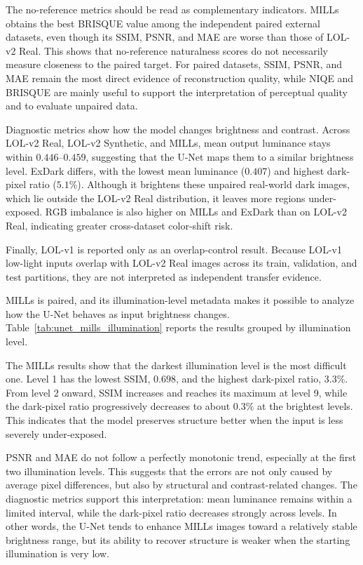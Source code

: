 The no-reference metrics should be read as complementary indicators. MILLs obtains the best BRISQUE value among the independent paired external datasets, even though its SSIM, PSNR, and MAE are worse than those of LOL-v2 Real. This shows that no-reference naturalness scores do not necessarily measure closeness to the paired target. For paired datasets, SSIM, PSNR, and MAE remain the most direct evidence of reconstruction quality, while NIQE and BRISQUE are mainly useful to support the interpretation of perceptual quality and to evaluate unpaired data.

Diagnostic metrics show how the model changes brightness and contrast. Across LOL-v2 Real, LOL-v2 Synthetic, and MILLs, mean output luminance stays within $0.446$--$0.459$, suggesting that the U-Net maps them to a similar brightness level. ExDark differs, with the lowest mean luminance ($0.407$) and highest dark-pixel ratio ($5.1\%$). Although it brightens these unpaired real-world dark images, which lie outside the LOL-v2 Real distribution, it leaves more regions under-exposed. RGB imbalance is also higher on MILLs and ExDark than on LOL-v2 Real, indicating greater cross-dataset color-shift risk.

Finally, LOL-v1 is reported only as an overlap-control result. Because LOL-v1 low-light inputs overlap with LOL-v2 Real images across its train, validation, and test partitions, they are not interpreted as independent transfer evidence.

MILLs is paired, and its illumination-level metadata makes it possible to analyze how the U-Net behaves as input brightness changes. Table~\ref{tab:unet_mills_illumination} reports the results grouped by illumination level.



The MILLs results show that the darkest illumination level is the most difficult one. Level 1 has the lowest SSIM, $0.698$, and the highest dark-pixel ratio, $3.3\%$. From level 2 onward, SSIM increases and reaches its maximum at level 9, while the dark-pixel ratio progressively decreases to about $0.3\%$ at the brightest levels. This indicates that the model preserves structure better when the input is less severely under-exposed.

PSNR and MAE do not follow a perfectly monotonic trend, especially at the first two illumination levels. This suggests that the errors are not only caused by average pixel differences, but also by structural and contrast-related changes. The diagnostic metrics support this interpretation: mean luminance remains within a limited interval, while the dark-pixel ratio decreases strongly across levels. In other words, the U-Net tends to enhance MILLs images toward a relatively stable brightness range, but its ability to recover structure is weaker when the starting illumination is very low.

